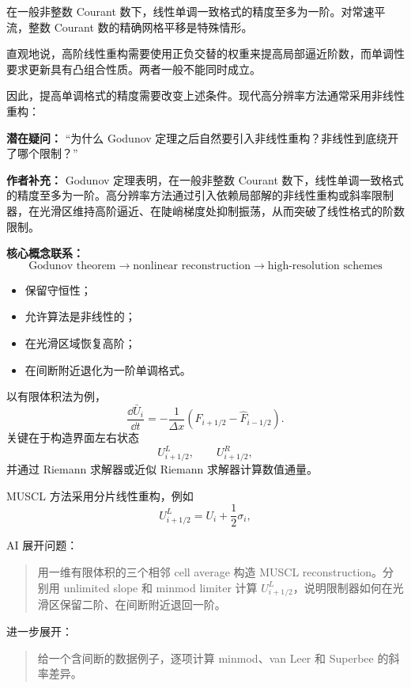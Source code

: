在一般非整数 Courant 数下，线性单调一致格式的精度至多为一阶。对常速平流，整数 Courant 数的精确网格平移是特殊情形。

直观地说，高阶线性重构需要使用正负交替的权重来提高局部逼近阶数，而单调性要求更新具有凸组合性质。两者一般不能同时成立。

因此，提高单调格式的精度需要改变上述条件。现代高分辨率方法通常采用非线性重构：

\begin{authornote}
\textbf{潜在疑问：}
“为什么 Godunov 定理之后自然要引入非线性重构？非线性到底绕开了哪个限制？”

\textbf{作者补充：}
Godunov 定理表明，在一般非整数 Courant 数下，线性单调一致格式的精度至多为一阶。高分辨率方法通过引入依赖局部解的非线性重构或斜率限制器，在光滑区维持高阶逼近、在陡峭梯度处抑制振荡，从而突破了线性格式的阶数限制。

\textbf{核心概念联系：}
\[
\text{Godunov theorem}
\longrightarrow
\text{nonlinear reconstruction}
\longrightarrow
\text{high-resolution schemes}
\]
\end{authornote}

\begin{itemize}
  \item 保留守恒性；
  \item 允许算法是非线性的；
  \item 在光滑区域恢复高阶；
  \item 在间断附近退化为一阶单调格式。
\end{itemize}

以有限体积法为例，
\[
\frac{\dd \bar U_i}{\dd t}
=
-\frac{1}{\Delta x}
\left(
\widehat F_{i+1/2}
-
\widehat F_{i-1/2}
\right).
\]
关键在于构造界面左右状态
\[
U_{i+1/2}^{L},
\qquad
U_{i+1/2}^{R},
\]
并通过 Riemann 求解器或近似 Riemann 求解器计算数值通量。

MUSCL 方法采用分片线性重构，例如
\[
U_{i+1/2}^{L}
=
U_i+\frac12\sigma_i,
\]

\begin{askai}
AI 展开问题：
\begin{quote}
用一维有限体积的三个相邻 cell average 构造 MUSCL reconstruction。分别用 unlimited slope 和 minmod limiter 计算 \(U_{i+1/2}^L\)，说明限制器如何在光滑区保留二阶、在间断附近退回一阶。
\end{quote}

进一步展开：
\begin{quote}
给一个含间断的数据例子，逐项计算 minmod、van Leer 和 Superbee 的斜率差异。
\end{quote}
\end{askai}

